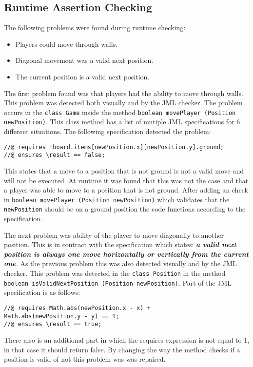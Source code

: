 \documentclass[a4paper]{article}
\begin{document}
	\subsection{Runtime Assertion Checking}
	The following problems were found during runtime checking:
	\begin{itemize}
		\item Players could move through walls.
		\item Diagonal movement was a valid next position.
		\item The current position is a valid next position.
	\end{itemize}
	The first problem found was that players had the ability to move through walls. This problem was detected both visually and by the JML checker. The problem occurs in the \texttt{class Game} inside the method \texttt{boolean movePlayer (Position newPosition)}. This class method has a list of mutiple JML specifications for 6 different situations. The following specification detected the problem:
	\begin{lstlisting}
//@ requires !board.items[newPosition.x][newPosition.y].ground;
//@ ensures \result == false;
	\end{lstlisting}
	This states that a move to a position that is not ground is not a valid move and will not be executed. At runtime it was found that this was not the case and that a player was able to move to a position that is not ground. After adding an check in \texttt{boolean movePlayer (Position newPosition)} which validates that the \texttt{newPosition} should be on a ground position the code functions according to the specification.
	
	The next problem was ability of the player to move diagonally to another position. This is in contract with the specification which states: \textbf{\textit{a valid next position is always one move horizontally or vertically from the current one}}. As the previous problem this was also detected visually and by the JML checker. This problem was detected in the \texttt{class Position} in the method \texttt{boolean isValidNextPosition (Position newPosition)}. Part of the JML specification is as follows:
	\begin{lstlisting}
//@ requires Math.abs(newPosition.x - x) + 
Math.abs(newPosition.y - y) == 1;
//@ ensures \result == true;
	\end{lstlisting}
	There also is an additional part in which the requires expression is not equal to 1, in that case it should return false. By changing the way the method checks if a position is valid of not this problem was was repaired.
	
\end{document}
